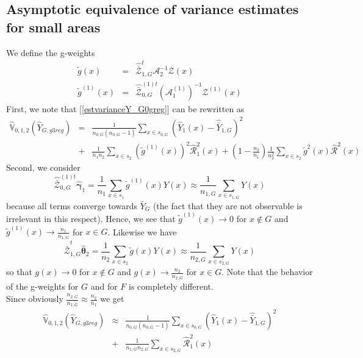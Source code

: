\documentclass[a4paper,12pt,leqno, titlepage]{article}
\newcommand{\VAR}{\mathbb{V}}
\begin{document}
\begin{appendix}
\section{Asymptotic equivalence of variance estimates for small areas} \label{proofofequivalence}
We define the g-weights
\begin{eqnarray}\label{smallgweights}
\tilde{g}(x)&=& \hat{\bar{\pmb{\mathcal{Z}}}}^{t}_{1,G}\pmb{\mathcal{A}}_2^{-1}\pmb{\mathcal{Z}}(x) \nonumber \\
\tilde{g}^{(1)}(x)&=&\hat{\bar{\pmb{\mathcal{Z}}}}^{(1)t}_{0,G}(\pmb{\mathcal{A}}^{(1)}_1)^{-1}\pmb{\mathcal{Z}}^{(1)}(x)
\end{eqnarray}
First, we note that [\ref{estvarianceY_G0greg}] can be rewritten as
\begin{eqnarray*}
\hat{\VAR}_{0,1,2}(\hat{Y}_{G,g3reg})&=&\frac{1}{n_{0,G}(n_{0,G}-1)}\sum_{x\in{s_{0,G}}}
(\hat{Y}_1(x)-\hat{\bar{Y}}_{1,G})^2 \\
&+& \frac{1}{n_1n_2}\sum_{x\in{s_2}} (\tilde{g}^{(1)}(x))^2\hat{\mathcal{R}}_1^2(x)
+(1-\frac{n_2}{n_1})\frac{1}{n_2^2}\sum_{x\in{s_2}}\tilde{g}^2(x)\hat{\mathcal{R}}^2(x)
\end{eqnarray*}
Second, we consider
\begin{equation*}
\hat{\bar{\pmb{\mathcal{Z}}}}^{(1)t}_{0,G}\hat{\pmb{\gamma}}_1=\frac{1}{n_1}\sum_{x\in{s_1}}\tilde{g}^{(1)}(x)Y(x)\approx
\frac{1}{n_{1,G}}\sum_{x\in{s_{1,G}}}Y(x)
\end{equation*}
 \noindent because all terms converge towards $\bar{Y}_G$ (the fact that they are not observable is irrelevant in this respect). Hence, we see that $\tilde{g}^{(1)}(x) \to 0$ for $x\not\in{G}$ and $\tilde{g}^{(1)}(x)\to \frac{n_1}{n_{1,G}}$ for $x\in{G}$. Likewise we have
\begin{equation*}
\hat{\bar{\pmb{\mathcal{Z}}}}^{t}_{1,G}\hat{\pmb{\theta}}_2=\frac{1}{n_2}\sum_{x\in{s_2}}\tilde{g}(x)Y(x)\approx
\frac{1}{n_{2,G}}\sum_{x\in{s_{2,G}}}Y(x)
\end{equation*}
\noindent so that $g(x) \to 0$ for $x\not\in{G}$ and $g(x)\to \frac{n_2}{n_{2,G}}$ for $x\in{G}$.  Note that the behavior of the g-weights for $G$ and for $F$ is completely different. \\
Since obviously $\frac{n_{2,G}}{n_{1,G}}\approx \frac{n_2}{n_1}$ we get
\begin{eqnarray}
\hat{\VAR}_{0,1,2}(\hat{Y}_{G,g3reg})&\approx&\frac{1}{n_{0,G}(n_{0,G}-1)}\sum_{x\in{s_{0,G}}}
(\hat{Y}_1(x)-\hat{\bar{Y}}_{1,G})^2 \\
&+& \frac{1}{n_{1,G}n_{2,G}}\sum_{x\in{s_{2,G}}}\hat{\mathcal{R}}_1^2(x)

\end{eqnarray}
\end{appendix}
\end{document}
